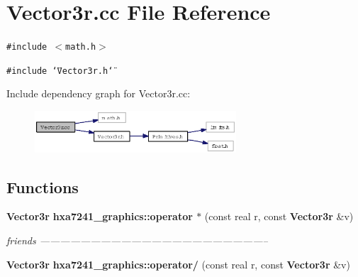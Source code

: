\section{Vector3r.cc File Reference}
\label{Vector3r_8cc}
{\tt \#include $<$math.h$>$}\par
{\tt \#include \char`\"{}Vector3r.h\char`\"{}}\par


Include dependency graph for Vector3r.cc:\begin{figure}[H]
\begin{center}
\leavevmode
\includegraphics[width=213pt]{Vector3r_8cc__incl}
\end{center}
\end{figure}
\subsection*{Functions}
\begin{CompactItemize}
\item 
{\bf Vector3r} {\bf hxa7241\_\-graphics::operator $\ast$} (const real r, const {\bf Vector3r} \&v)
\begin{CompactList}\small\item\em friends -------------------------------------------------------------------- \item\end{CompactList}\item 
{\bf Vector3r} {\bf hxa7241\_\-graphics::operator/} (const real r, const {\bf Vector3r} \&v)
\end{CompactItemize}
